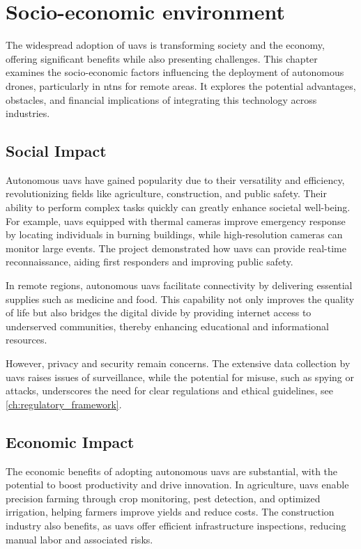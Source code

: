 \chapter{Socio-economic environment}\label{ch:socio_economic_environment}

The widespread adoption of \glspl{uav} is transforming society and the economy, offering significant benefits while also presenting challenges. This chapter examines the socio-economic factors influencing the deployment of autonomous drones, particularly in \glspl{ntn} for remote areas. It explores the potential advantages, obstacles, and financial implications of integrating this technology across industries.

\section{Social Impact}\label{sec:social_impact}

Autonomous \glspl{uav} have gained popularity due to their versatility and efficiency, revolutionizing fields like agriculture, construction, and public safety. Their ability to perform complex tasks quickly can greatly enhance societal well-being. For example, \glspl{uav} equipped with thermal cameras improve emergency response by locating individuals in burning buildings, while high-resolution cameras can monitor large events. The project demonstrated how \glspl{uav} can provide real-time reconnaissance, aiding first responders and improving public safety.

In remote regions, autonomous \glspl{uav} facilitate connectivity by delivering essential supplies such as medicine and food. This capability not only improves the quality of life but also bridges the digital divide by providing internet access to underserved communities, thereby enhancing educational and informational resources.

However, privacy and security remain concerns. The extensive data collection by \glspl{uav} raises issues of surveillance, while the potential for misuse, such as spying or attacks, underscores the need for clear regulations and ethical guidelines, see \cref{ch:regulatory_framework}.

\section{Economic Impact}\label{sec:economic_impact}

The economic benefits of adopting autonomous \glspl{uav} are substantial, with the potential to boost productivity and drive innovation. In agriculture, \glspl{uav} enable precision farming through crop monitoring, pest detection, and optimized irrigation, helping farmers improve yields and reduce costs. The construction industry also benefits, as \glspl{uav} offer efficient infrastructure inspections, reducing manual labor and associated risks.

